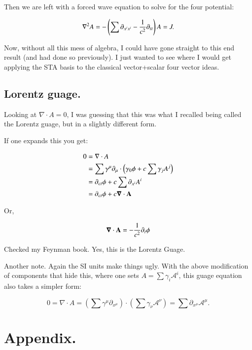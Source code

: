 \documentclass{article}
\newcommand{\spacegrad}[0]{\boldsymbol{\nabla}}
\newcommand{\grad}[0]{\nabla}
\newcommand{\CA}[0]{\mathcal{A}}
\begin{document}
Then we are left with a forced wave equation to solve for the four potential:

\begin{equation*}
\grad^2 A = -\left(\sum \partial_{x^i x^i} - \inv{c^2}\partial_{tt}\right) A = J.
\end{equation*}

Now, without all this mess of algebra, I could have gone straight to this end result (and had done so previously).  I just
wanted to see where I would get applying the STA basis to the classical vector+scalar four vector ideas.

\subsection{ Lorentz guage. }

Looking at $\grad \cdot A = 0$, I was guessing that this was what I recalled being called the Lorentz guage, but in a
slightly different form.

If one expands this you get:

\begin{align*}
0 
&= \grad \cdot A \\
&= \sum \gamma^{\mu} \partial_{\mu} \cdot \left(\gamma_0 \phi + c \sum \gamma_j A^j \right) \\
&= \partial_{ct} \phi + c \sum \partial_{x^i}A^i \\
&= \partial_{ct} \phi + c \spacegrad \cdot \BA
\end{align*}

Or,

\begin{equation}
\spacegrad \cdot \BA = -\inv{c^2}\partial_{t} \phi
\end{equation}

Checked my Feynman book.  Yes, this is the Lorentz Guage.

Another note.  Again the SI units make things ugly.  With the above modification of components that hide this, where one sets $A = \sum \gamma_i \CA^i$, this guage equation also takes a simpler form:

\begin{equation*}
0 = \grad \cdot A = \left(\sum \gamma^{\mu} \partial_{x^{\mu}}\right) \cdot \left(\sum \gamma_{\nu} \CA^{\nu}\right) = \sum \partial_{x^{\mu}} \CA^{\mu}.
\end{equation*}

\section{ Appendix. }
\end{document}
